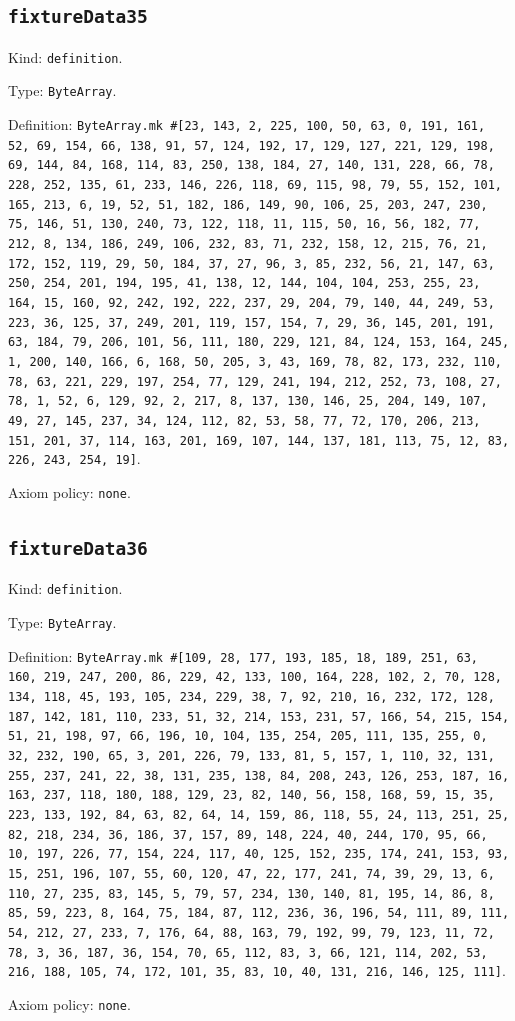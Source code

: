 \documentclass[11pt]{article}
\begin{document}
\subsection*{\texttt{fixtureData35}}
\noindent Kind: \texttt{definition}.\par
\noindent Type: \texttt{ByteArray}.\par
\noindent Definition: \texttt{ByteArray.mk \#[23, 143, 2, 225, 100, 50, 63, 0, 191, 161, 52, 69, 154, 66, 138, 91, 57, 124, 192, 17, 129, 127, 221, 129, 198, 69, 144, 84, 168, 114, 83, 250, 138, 184, 27, 140, 131, 228, 66, 78, 228, 252, 135, 61, 233, 146, 226, 118, 69, 115, 98, 79, 55, 152, 101, 165, 213, 6, 19, 52, 51, 182, 186, 149, 90, 106, 25, 203, 247, 230, 75, 146, 51, 130, 240, 73, 122, 118, 11, 115, 50, 16, 56, 182, 77, 212, 8, 134, 186, 249, 106, 232, 83, 71, 232, 158, 12, 215, 76, 21, 172, 152, 119, 29, 50, 184, 37, 27, 96, 3, 85, 232, 56, 21, 147, 63, 250, 254, 201, 194, 195, 41, 138, 12, 144, 104, 104, 253, 255, 23, 164, 15, 160, 92, 242, 192, 222, 237, 29, 204, 79, 140, 44, 249, 53, 223, 36, 125, 37, 249, 201, 119, 157, 154, 7, 29, 36, 145, 201, 191, 63, 184, 79, 206, 101, 56, 111, 180, 229, 121, 84, 124, 153, 164, 245, 1, 200, 140, 166, 6, 168, 50, 205, 3, 43, 169, 78, 82, 173, 232, 110, 78, 63, 221, 229, 197, 254, 77, 129, 241, 194, 212, 252, 73, 108, 27, 78, 1, 52, 6, 129, 92, 2, 217, 8, 137, 130, 146, 25, 204, 149, 107, 49, 27, 145, 237, 34, 124, 112, 82, 53, 58, 77, 72, 170, 206, 213, 151, 201, 37, 114, 163, 201, 169, 107, 144, 137, 181, 113, 75, 12, 83, 226, 243, 254, 19]}.\par
\noindent Axiom policy: \texttt{none}.\par
\subsection*{\texttt{fixtureData36}}
\noindent Kind: \texttt{definition}.\par
\noindent Type: \texttt{ByteArray}.\par
\noindent Definition: \texttt{ByteArray.mk \#[109, 28, 177, 193, 185, 18, 189, 251, 63, 160, 219, 247, 200, 86, 229, 42, 133, 100, 164, 228, 102, 2, 70, 128, 134, 118, 45, 193, 105, 234, 229, 38, 7, 92, 210, 16, 232, 172, 128, 187, 142, 181, 110, 233, 51, 32, 214, 153, 231, 57, 166, 54, 215, 154, 51, 21, 198, 97, 66, 196, 10, 104, 135, 254, 205, 111, 135, 255, 0, 32, 232, 190, 65, 3, 201, 226, 79, 133, 81, 5, 157, 1, 110, 32, 131, 255, 237, 241, 22, 38, 131, 235, 138, 84, 208, 243, 126, 253, 187, 16, 163, 237, 118, 180, 188, 129, 23, 82, 140, 56, 158, 168, 59, 15, 35, 223, 133, 192, 84, 63, 82, 64, 14, 159, 86, 118, 55, 24, 113, 251, 25, 82, 218, 234, 36, 186, 37, 157, 89, 148, 224, 40, 244, 170, 95, 66, 10, 197, 226, 77, 154, 224, 117, 40, 125, 152, 235, 174, 241, 153, 93, 15, 251, 196, 107, 55, 60, 120, 47, 22, 177, 241, 74, 39, 29, 13, 6, 110, 27, 235, 83, 145, 5, 79, 57, 234, 130, 140, 81, 195, 14, 86, 8, 85, 59, 223, 8, 164, 75, 184, 87, 112, 236, 36, 196, 54, 111, 89, 111, 54, 212, 27, 233, 7, 176, 64, 88, 163, 79, 192, 99, 79, 123, 11, 72, 78, 3, 36, 187, 36, 154, 70, 65, 112, 83, 3, 66, 121, 114, 202, 53, 216, 188, 105, 74, 172, 101, 35, 83, 10, 40, 131, 216, 146, 125, 111]}.\par
\noindent Axiom policy: \texttt{none}.\par
\end{document}
